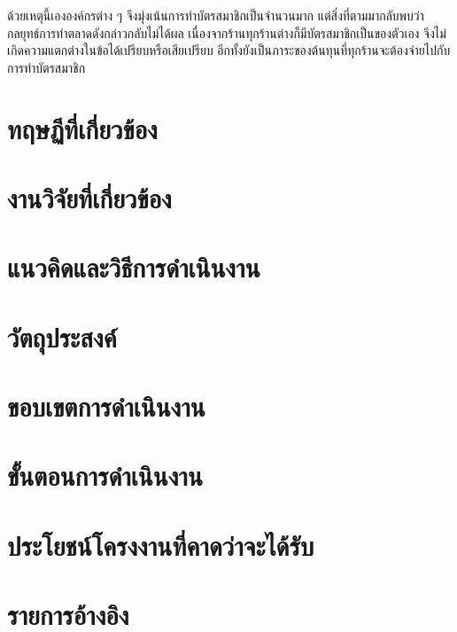 \documentclass[a4paper]{article}
\begin{document}
ด้วยเหตุนี้เององค์กรต่าง ๆ จึงมุ่งเน้นการทำบัตรสมาชิกเป็นจำนวนมาก แต่สิ่งที่ตามมากลับพบว่ากลยุทธ์การทำตลาดดังกล่าวกลับไม่ได้ผล เนื่องจากร้านทุกร้านต่างก็มีบัตรสมาชิกเป็นของตัวเอง จึงไม่เกิดความแตกต่างในข้อได้เปรียบหรือเสียเปรียบ อีกทั้งยังเป็นภาระของต้นทุนที่ทุกร้านจะต้องจ่ายไปกับการทำบัตรสมาชิก

\section{ทฤษฏีที่เกี่ยวข้อง}

\section{งานวิจัยที่เกี่ยวข้อง}

\section{แนวคิดและวิธีการดำเนินงาน}

\section{วัตถุประสงค์}

\section{ขอบเขตการดำเนินงาน}

\section{ขั้นตอนการดำเนินงาน}

\section{ประโยชน์โครงงานที่คาดว่าจะได้รับ}

\section{รายการอ้างอิง}
\end{document}
